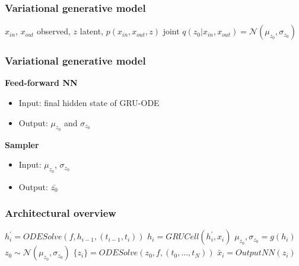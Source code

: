 \documentclass{beamer}
\begin{document}
{\begin{frame}

\end{frame}
\begin{frame}
	\frametitle{Variational generative model}
	 \center $x_{in}$, $x_{out}$ observed, $z$ latent, $p(x_{in}, x_{out}, z)$ joint
	\pause \center $q(z_{0}|x_{in}, x_{out}) =  \mathcal{N}(\mu_{z_{0}},\sigma_{z_{0}})$
\end{frame}
}
\begin{frame}
	\frametitle{Variational generative model}
	\textbf{Feed-forward NN}
	\begin{itemize}
	 \item{Input: final hidden state of GRU-ODE}
	 \item{Output: $\mu_{z_{0}}$ and $\sigma_{z_{0}}$}
	\end{itemize}
	\hfill \break
	\pause \textbf{Sampler}
	\begin{itemize}
	 \item{Input: $\mu_{z_{0}}$, $\sigma_{z_{0}}$}
	 \item{Output: $\bar{z_{0}}$}
	\end{itemize}
\end{frame}
\begin{frame}
	\frametitle{Architectural overview}
	\center $h_{i}^{'}=ODESolve(f, h_{i-1}, (t_{i-1},t_{i}))$
	\center \pause $h_{i}=GRUCell(h_{i}^{'},x_{i})$
	\center \pause $\mu_{z_{0}}, \sigma_{z_{0}} =g(h_{i})$
	\center \pause $z_{0} \sim \mathcal{N}(\mu_{z_{0}},\sigma_{z_{0}})$
	\center \pause $\{z_{i}\}=ODESolve(z_{0}, f, (t_{0},...,t_{N}))$
	\center \pause $\widetilde{x_{i}}=OutputNN(z_{i})$

\end{frame}
\end{document}
